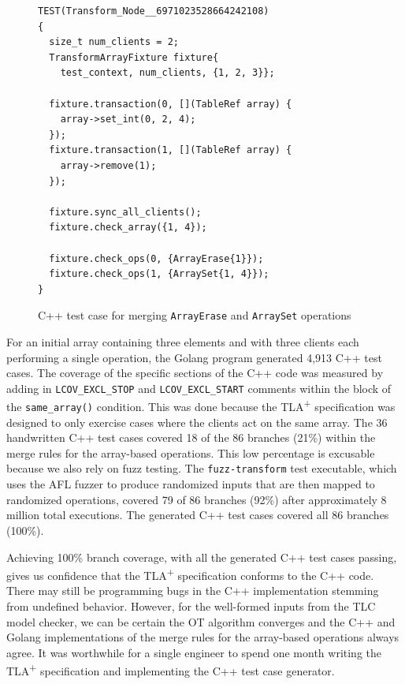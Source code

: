 \documentclass{vldb}
\begin{document}
\begin{figure}
\begin{verbatim}
TEST(Transform_Node__6971023528664242108)
{
  size_t num_clients = 2;
  TransformArrayFixture fixture{
    test_context, num_clients, {1, 2, 3}};

  fixture.transaction(0, [](TableRef array) {
    array->set_int(0, 2, 4);
  });
  fixture.transaction(1, [](TableRef array) {
    array->remove(1);
  });

  fixture.sync_all_clients();
  fixture.check_array({1, 4});

  fixture.check_ops(0, {ArrayErase{1}});
  fixture.check_ops(1, {ArraySet{1, 4}});
}
\end{verbatim}
\caption{C++ test case for merging \texttt{ArrayErase} and \texttt{ArraySet} operations}
\label{fig:cpp_test_erase_set_merge}
\end{figure}

For an initial array containing three elements and with three clients each performing a single operation, the Golang program generated 4,913 C++ test cases.
The coverage of the specific sections of the C++ code was measured by adding in \texttt{LCOV\_EXCL\_STOP} and \texttt{LCOV\_EXCL\_START} comments within the block of the \texttt{same\_array()} condition. This was done because the TLA\textsuperscript{+} specification was designed to only exercise cases where the clients act on the same array.
The 36 handwritten C++ test cases covered 18 of the 86 branches (21\%) within the merge rules for the array-based operations.
This low percentage is excusable because we also rely on fuzz testing.
The \texttt{fuzz-transform} test executable, which uses the AFL fuzzer \cite{AFLHomepage} to produce randomized inputs that are then mapped to randomized operations, covered 79 of 86 branches (92\%) after approximately 8 million total executions.
The generated C++ test cases covered all 86 branches (100\%).



Achieving 100\% branch coverage, with all the generated C++ test cases passing, gives us confidence that the TLA\textsuperscript{+} specification conforms to the C++ code.
There may still be programming bugs in the C++ implementation stemming from undefined behavior.
However, for the well-formed inputs from the TLC model checker, we can be certain the OT algorithm converges and the C++ and Golang implementations of the merge rules for the array-based operations always agree.
It was worthwhile for a single engineer to spend one month writing the TLA\textsuperscript{+} specification and implementing the C++ test case generator.
\end{document}

